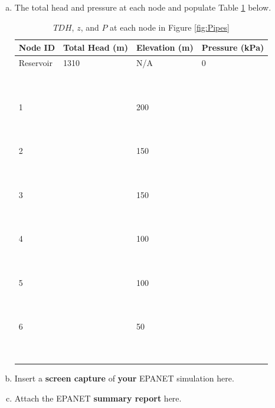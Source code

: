\documentclass[12pt]{article}
\begin{document}
\begin{enumerate}
\begin{enumerate}[a)]
\clearpage
\item The total head and pressure at each node and populate Table \ref{tab:booktabs} below.
\begin{table}[htbp]
      \caption{$TDH$, $z$,  and $P$ at  each node in Figure \ref{fig:Pipes} \\}
   \begin{tabular}{| p{1in} | p{1.1in} | p{1in} | p{1.1in} | } %
   \hline
   \hline
Node ID & Total Head (m) & Elevation (m) & Pressure (kPa) \\
\hline
\hline
Reservoir & 1310 & N/A & 0  \\
~ & ~ & ~ & ~  \\
~ & ~ & ~ & ~  \\
\hline
1 & ~ & 200 & ~  \\
~ & ~ & ~ & ~  \\
~ & ~ & ~ & ~  \\
\hline
2 & ~ & 150 & ~  \\
~ & ~ & ~ & ~  \\
~ & ~ & ~ & ~  \\
\hline
3 & ~ & 150 & ~  \\
~ & ~ & ~ & ~  \\
~ & ~ & ~ & ~  \\
\hline
4 & ~ & 100 & ~  \\
~ & ~ & ~ & ~  \\
~ & ~ & ~ & ~  \\
\hline
5 & ~ & 100 & ~  \\
~ & ~ & ~ & ~  \\
~ & ~ & ~ & ~  \\
\hline
6 & ~ & 50 & ~  \\
~ & ~ & ~ & ~  \\
~ & ~ & ~ & ~  \\
\hline
\hline

   \end{tabular}

   \label{tab:booktabs}
\end{table}

\item Insert a \textbf{screen capture} of \textbf{your} EPANET simulation here.
\item Attach the EPANET \textbf{summary report} here.
\end{enumerate}


\end{enumerate}
\end{document}
